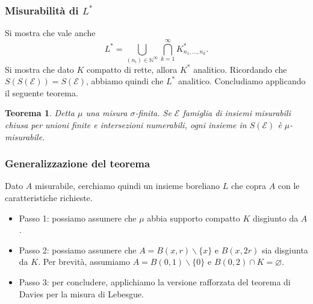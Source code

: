 \documentclass[11pt]{beamer} %
\newcommand{\N}{\mathbb{N}}
\newcommand{\E}{\mathcal{E}}
\newcommand{\<}{\langle}
\renewcommand{\>}{\rangle}
\theoremstyle{theorem}
\newtheorem{teo}{Teorema}
\theoremstyle{theorem}
\theoremstyle{theorem}
\theoremstyle{theorem}
\theoremstyle{theorem}
\begin{document}
\begin{frame}
\frametitle{Misurabilità di $L^*$}	
Si mostra che vale anche
$$L^*=\bigcup_{{ (n_i)}\in{\N}^\infty}\bigcap_{k=1}^\infty K_{n_1,\ldots,n_k}^*.$$ 
\pause
Si mostra che dato $K$ compatto di rette, allora $K^*$ analitico. \pause
Ricordando che $S(S(\E))=S(\E)$, abbiamo quindi che $L^*$ analitico. \pause Concludiamo applicando il seguente teorema. \\
\pause
\begin{teo}
 	Detta $\mu$ una misura $\sigma$-finita. Se $\E$ famiglia di insiemi misurabili chiusa per unioni finite e intersezioni numerabili, ogni insieme in $S(\E)$ è $\mu$-misurabile.
\end{teo}	
	
	
\end{frame}


\begin{frame}[fragile]

\frametitle{Generalizzazione del teorema}
Dato $A$ misurabile, cerchiamo quindi un insieme boreliano $L$ che copra $A$ con le caratteristiche richieste. \\ \pause
\medskip
{}
	\begin{itemize}
		\item Passo 1: possiamo assumere che $\mu$ abbia supporto compatto $K$ disgiunto da $A$.\\ \pause
		\item Passo 2: possiamo assumere che $A=B(x, r) \backslash\{x\}$ e $B(x, 2 r)$ sia disgiunta da $K$. Per brevità, assumiamo $A=B(0,1) \backslash\{0\}$ e $B(0,2) \cap K=\varnothing$.\\ \pause
		\item Passo 3: per concludere, applichiamo la versione rafforzata del teorema di Davies per la misura di Lebesgue.
	\end{itemize}
\end{frame}
\end{document}
